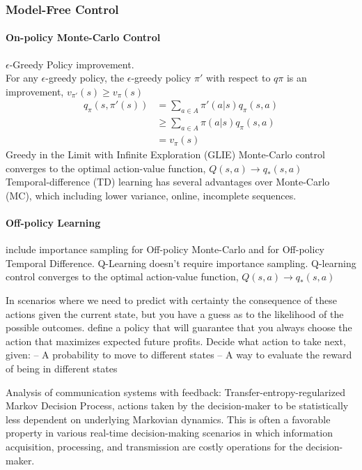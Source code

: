 \documentclass[letterpaper, 10pt, conference]{IEEEtran} %
\begin{document}
\subsubsection{Model-Free Control}
\paragraph{On-policy Monte-Carlo Control} $\epsilon$-Greedy Policy improvement. \\
For any $\epsilon$-greedy policy, the $\epsilon$-greedy policy $\pi '$ with respect to $q\pi$ is an improvement, $v_{\pi '}(s) \geq v_{\pi}(s)$
\begin{equation}
\begin{aligned}
q_\pi (s, \pi '(s))&=\sum_{a \in A} \pi'(a|s) q_\pi (s,a)\\
&\geq \sum_{a \in A} \pi (a|s) q_\pi (s,a)\\
& = v_\pi (s)
\end{aligned}
\end{equation}
Greedy in the Limit with Infinite Exploration (GLIE) Monte-Carlo control converges to the optimal action-value function, $Q(s, a) \rightarrow q_\ast (s, a)$\\
Temporal-difference (TD) learning has several advantages over Monte-Carlo (MC), which including lower variance, online, incomplete sequences.
\paragraph{Off-policy Learning} include importance sampling for Off-policy Monte-Carlo and for Off-policy Temporal Difference. Q-Learning doesn't require importance sampling. Q-learning control converges to the optimal action-value function, $Q(s, a) \rightarrow q_\ast (s, a)$


In scenarios where we need to predict with certainty the consequence of these actions given the current state, but you have a guess as to the likelihood of the possible outcomes. 
define a policy that will guarantee that you always choose the action that maximizes expected
future profits.
Decide what action to take next, given:
– A probability to move to different states
– A way to evaluate the reward of being in different
states


Analysis of communication systems with feedback:
Transfer-entropy-regularized Markov Decision Process, actions taken by the decision-maker to be statistically less dependent on underlying Markovian dynamics. This is often a favorable property in various real-time decision-making scenarios in which information acquisition, processing, and transmission are costly operations for the decision-maker.
\end{document}
